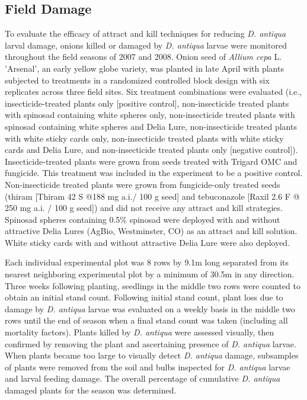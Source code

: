 \documentclass[num-refs]{wiley-article}
\begin{document}
\subsection{Field Damage}

To evaluate the efficacy of attract and kill techniques for reducing \textit{D. antiqua} larval damage, onions killed or damaged by \textit{D. antiqua} larvae were monitored throughout the field seasons of 2007 and 2008. Onion seed of \textit{Allium cepa} L. ’Arsenal’, an early yellow globe variety, was planted in late April with plants subjected to treatments in a randomized controlled block design with six replicates across three field sites.  Six treatment combinations were evaluated (i.e., insecticide-treated plants only [positive control], non-insecticide treated plants with spinosad containing white spheres only, non-insecticide treated plants with spinosad containing white spheres and Delia Lure, non-insecticide treated plants with white sticky cards only, non-insecticide treated plants with white sticky cards and Delia Lure, and non-insecticide treated plants only [negative control]).  Insecticide-treated plants were grown from seeds treated with Trigard OMC and fungicide.  This treatment was included in the experiment to be a positive control. Non-insecticide treated plants were grown from fungicide-only treated seeds (thiram [Thiram 42 S {@}188 mg a.i./ 100 g seed] and tebuconazole [Raxil 2.6 F @ 250 mg a.i. / 100 g seed]) and did not receive any attract and kill strategies. Spinosad spheres containing 0.5\% spinosad were deployed with and without attractive Delia Lures (AgBio, Westminster, CO) as an attract and kill solution. White sticky cards with and without attractive Delia Lure were also deployed. 

Each individual experimental plot was 8 rows by 9.1m  long separated from its nearest neighboring experimental plot by a minimum of 30.5m in any direction. Three weeks following planting, seedlings in the middle two rows were counted to obtain an initial stand count. Following initial stand count, plant loss due to damage by \textit{D. antiqua} larvae was evaluated on a weekly basis in the middle two rows until the end of season when a final stand count was taken (including all mortality factors). Plants killed by \textit{D. antiqua} were assessed visually, then confirmed by removing the plant and ascertaining presence of \textit{D. antiqua} larvae. When plants became too large to visually detect \textit{D. antiqua} damage, subsamples of plants were removed from the soil and bulbs inspected for \textit{D. antiqua} larvae and larval feeding damage. The overall percentage of cumulative \textit{D. antiqua} damaged plants for the season was determined. 
\end{document}
